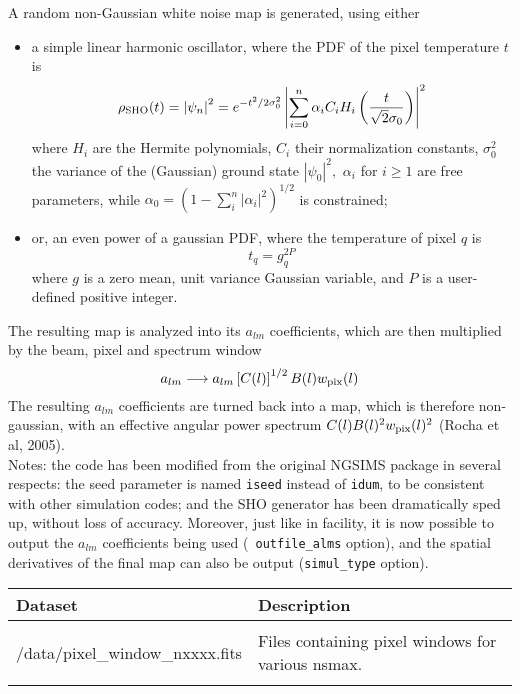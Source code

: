 \begin{codedescription}
{%
A random non-Gaussian white noise map is generated, using either
\begin{itemize}
%
\item a simple linear harmonic oscillator, where the PDF of the pixel
temperature $t$ is
	\begin{equation}
	\rho_{\rm SHO}(t) = \left| \psi_n\right|^2 = e^{-t^2/2\sigma_0^2} \left|\sum_{i=0}^{n} \alpha_i
C_i H_i \left(\frac{t}{\sqrt{2}\sigma_0}\right)\right|^2 \label{eq:nongauss_sho}
	\end{equation}
where $H_i$ are the Hermite polynomials, $C_i$ their normalization constants,
$\sigma_0^2$ the variance of the (Gaussian) ground state $\left|\psi_0\right|^2,$
$\alpha_i$ for $i\ge 1$ are free parameters, while $\alpha_0 =
\left(1 - \sum_i^n |\alpha_i|^2\right)^{1/2}$ is constrained;
%
\item or, an even power of a gaussian PDF, where the temperature of pixel $q$ is
	\begin{equation}
	t_q = g_q^{2 P} \label{eq:nongauss_powgauss}
	\end{equation}
where $g$ is a zero mean, unit variance Gaussian variable, and $P$ is
a user-defined positive integer.
\end{itemize}
The resulting map is analyzed into its $a_{lm}$ coefficients, which are then
multiplied by the beam, pixel and spectrum window
\begin{equation}
	a_{lm} \longrightarrow a_{lm} \left[C(l)\right]^{1/2} B(l) w_{\rm pix}(l) \nonumber
\end{equation}
The resulting $a_{lm}$ coefficients are turned back into a map, which is
therefore non-gaussian, with an effective angular power spectrum $C(l) B(l)^2
w_{\rm pix}(l)^2$ (Rocha et al, 2005).
\\
Notes: the code has been modified from the original NGSIMS package in several
respects:
the seed parameter is named {\tt iseed} instead of {\tt idum}, to be consistent
with other \healpix simulation codes; and the SHO generator has been
dramatically sped up, without loss of accuracy. Moreover, just like in  facility,
it is now possible to output the $a_{lm}$ coefficients being used ({\tt
outfile\_alms} option), and the spatial derivatives of the final map can also be
output ({\tt simul\_type} option).
}
\end{codedescription}


\begin{datasets}
{
\begin{tabular}{p{0.3\hsize} p{0.35\hsize}} \hline  
  \textbf{Dataset} & \textbf{Description} \\ \hline
                   &                      \\ %
  /data/pixel\_window\_nxxxx.fits & Files containing pixel windows for
                   various nsmax.\\ 
                   &                      \\ \hline %
\end{tabular}
} 
\end{datasets}

